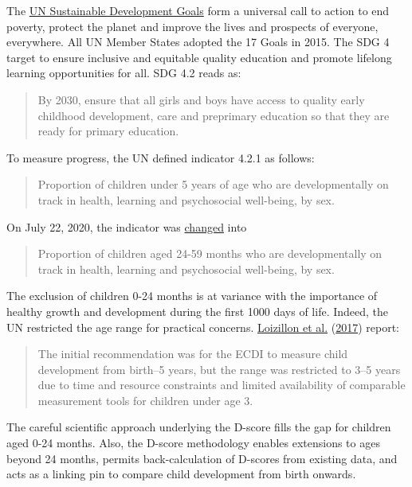 \documentclass[
]{book}
\begin{document}
The \href{https://www.un.org/sustainabledevelopment/development-agenda/}{UN Sustainable Development Goals} form a universal call to action to end poverty, protect the planet and improve the lives and prospects of everyone, everywhere. All UN Member States adopted the 17 Goals in 2015. The SDG 4 target to ensure inclusive and equitable quality education and promote lifelong learning opportunities for all. SDG 4.2 reads as:

\begin{quote}
By 2030, ensure that all girls and boys have access to quality early childhood development, care and preprimary education so that they are ready for primary education.
\end{quote}

To measure progress, the UN defined indicator 4.2.1 as follows:

\begin{quote}
Proportion of children under 5 years of age who are developmentally on track in health, learning and psychosocial well-being, by sex.
\end{quote}

On July 22, 2020, the indicator was \href{https://unstats.un.org/sdgs/metadata/}{changed} into

\begin{quote}
Proportion of children aged 24-59 months who are developmentally on track in health, learning and psychosocial well-being, by sex.
\end{quote}

The exclusion of children 0-24 months is at variance with the importance of healthy growth and development during the first 1000 days of life. Indeed, the UN restricted the age range for practical concerns. \protect\hyperlink{ref-loizillon2017}{Loizillon et al.} (\protect\hyperlink{ref-loizillon2017}{2017}) report:

\begin{quote}
The initial recommendation was for the ECDI to measure child development from birth--5 years, but the range was restricted to 3--5 years due to time and resource constraints and limited availability of comparable measurement tools for children under age 3.
\end{quote}

The careful scientific approach underlying the D-score fills the gap for children aged 0-24 months. Also, the D-score methodology enables extensions to ages beyond 24 months, permits back-calculation of D-scores from existing data, and acts as a linking pin to compare child development from birth onwards.
\end{document}
